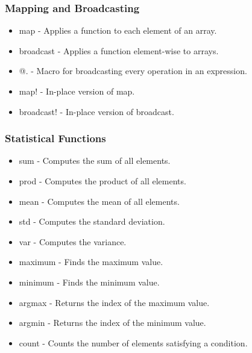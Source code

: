 \documentclass{report}
\begin{document}
    \bigbreak \noindent 
    \subsubsection{Mapping and Broadcasting}
\begin{itemize}
        \item map - Applies a function to each element of an array.
        \item broadcast - Applies a function element-wise to arrays.
        \item @. - Macro for broadcasting every operation in an expression.
        \item map! - In-place version of map.
        \item broadcast! - In-place version of broadcast.
    \end{itemize}

    \bigbreak \noindent 
    \subsubsection{Statistical Functions}
    \begin{itemize}
        \item sum - Computes the sum of all elements.
        \item prod - Computes the product of all elements.
        \item mean - Computes the mean of all elements.
        \item std - Computes the standard deviation.
        \item var - Computes the variance.
        \item maximum - Finds the maximum value.
        \item minimum - Finds the minimum value.
        \item argmax - Returns the index of the maximum value.
        \item argmin - Returns the index of the minimum value.
        \item count - Counts the number of elements satisfying a condition.
    \end{itemize}

    \bigbreak \noindent 
\end{document}
